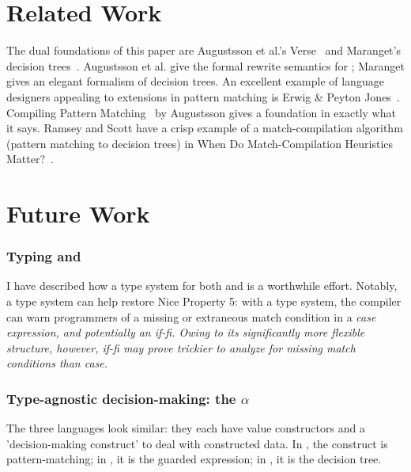 \documentclass[manuscript,screen,review, 12pt, nonacm]{acmart}
\begin{document}
    \section{Related Work}

    The dual foundations of this paper are Augustsson et al.'s
    Verse~\citep{verse} and Maranget's decision trees~\citep{maranget}.
    Augustsson et al. give the formal rewrite semantics for \VC; Maranget gives
    an elegant formalism of decision trees. An excellent example of language
    designers appealing to extensions in pattern matching is Erwig \&
    Peyton Jones~\citep{guardproposal}. Compiling Pattern
    Matching~\citep{augustsson1985compiling} by Augustsson gives a foundation in
    exactly what it says. Ramsey and Scott have a crisp example of a
    match-compilation algorithm (pattern matching to decision trees) in When Do
    Match-Compilation Heuristics Matter?~\citep{scottramsey}. 
    
    \section{Future Work}        
    \label{futurework}
        \subsubsection{Typing \PPlus and \VMinus}
        \label{typingppandvm}

        I have described how a type system for both \PPlus and \VMinus is a
        worthwhile effort. Notably, a type system can help restore Nice Property
        5: with a type system, the compiler can warn programmers of a missing or
        extraneous match condition in a \it{case} expression, and potentially an
        \it{if-fi}. Owing to its significantly more flexible structure, however,
        \it{if-fi} may prove trickier to analyze for missing match conditions
        than \it{case}.

        \subsubsection{Type-agnostic decision-making: the $\alpha$}
        \label{alphas}

        The three languages look similar: they each have value constructors and
        a 'decision-making construct' to deal with constructed data. In \PPlus, the
        construct is pattern-matching; in \VMinus, it is the guarded expression; in \D,
        it is the decision tree. 
\end{document}
